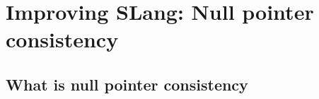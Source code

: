 \section{Improving SLang: Null pointer consistency}
\label{sec:improving_slang}

\subsection{What is null pointer consistency}
